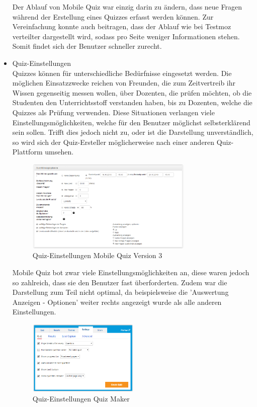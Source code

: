 \begin{itemize}
		Der Ablauf von Mobile Quiz war einzig darin zu ändern, dass neue Fragen während der Erstellung eines Quizzes erfasst werden können. Zur Vereinfachung konnte auch beitragen, dass der Ablauf wie bei Testmoz \cite{testmoz.com} verteilter dargestellt wird, sodass pro Seite weniger Informationen stehen. Somit findet sich der Benutzer schneller zurecht.
		
		
		
		
		\item  Quiz-Einstellungen \\
		Quizzes können für unterschiedliche Bedürfnisse eingesetzt werden. Die möglichen Einsatzzwecke reichen von Freunden, die zum Zeitvertreib ihr Wissen gegenseitig messen wollen, über Dozenten, die prüfen möchten, ob die Studenten den Unterrichtsstoff verstanden haben, bis zu Dozenten, welche die Quizzes als Prüfung verwenden.
		Diese Situationen verlangen viele Einstellungsmöglichkeiten, welche für den Benutzer möglichst selbsterklärend sein sollen. Trifft dies jedoch nicht zu, oder ist die Darstellung unverständlich, so wird sich der Quiz-Ersteller möglicherweise nach einer anderen Quiz-Plattform umsehen.
		
		\begin{figure}[H]
			\centering
			\includegraphics[width=0.75\textwidth
			]{Images/MobileQuiz_Quiz-Settings.PNG}
			\caption{Quiz-Einstellungen Mobile Quiz Version 3}
		\end{figure}
		
		
		Mobile Quiz bot zwar viele Einstellungsmöglichkeiten an, diese waren jedoch so zahlreich, dass sie den Benutzer fast überforderten. Zudem war die Darstellung zum Teil nicht optimal, da beispielsweise die 'Auswertung Anzeigen - Optionen' weiter rechts angezeigt wurde als alle anderen Einstellungen.
		
		\begin{figure}[H]
			\centering
			\includegraphics[width=0.5\textwidth
			]{Images/QuizMaker_Quiz-Settings.PNG}
			\caption{Quiz-Einstellungen Quiz Maker}
		\end{figure}
		

\end{itemize}
